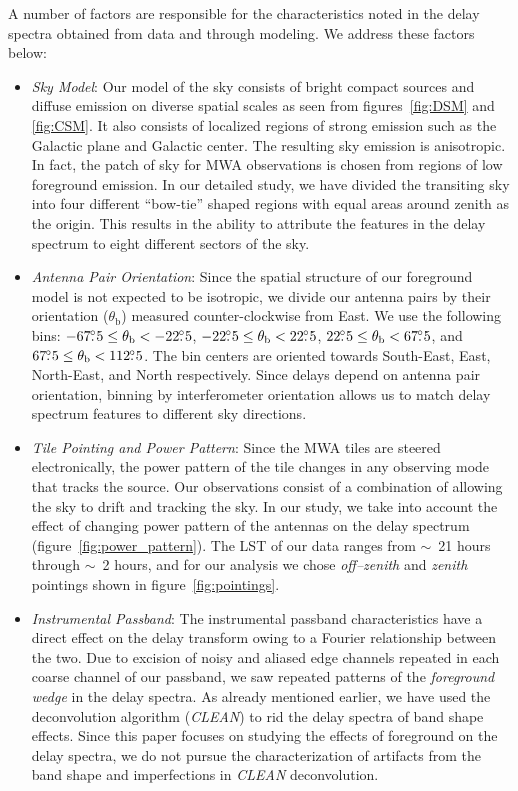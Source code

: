 \documentclass[preprint2,iop,numberedappendix]{emulateapj}
\begin{document}
A number of factors are responsible for the characteristics noted in the delay spectra obtained from data and through modeling. We address these factors below:
\begin{itemize}

\item {\it Sky Model}: Our model of the sky consists of bright compact sources and diffuse emission on diverse spatial scales as seen from figures~\ref{fig:DSM} and \ref{fig:CSM}. It also consists of localized regions of strong emission such as the Galactic plane and Galactic center. The resulting sky emission is anisotropic. In fact, the patch of sky for MWA observations is chosen from regions of low foreground emission. In our detailed study, we have divided the transiting sky into four different ``bow-tie'' shaped regions with equal areas around zenith as the origin. This results in the ability to attribute the features in the delay spectrum to eight different sectors of the sky. 

\item {\it Antenna Pair Orientation}: Since the spatial structure of our foreground model is not expected to be isotropic, we divide our antenna pairs by their orientation ($\theta_\textrm{b}$) measured counter-clockwise from East. We use the following bins: $-67\mbox{$.\!\!^\circ$} 5\le \theta_\textrm{b} < -22\mbox{$.\!\!^\circ$} 5$, $-22\mbox{$.\!\!^\circ$} 5\le \theta_\textrm{b} < 22\mbox{$.\!\!^\circ$} 5$, $22\mbox{$.\!\!^\circ$} 5\le \theta_\textrm{b} < 67\mbox{$.\!\!^\circ$} 5$, and $67\mbox{$.\!\!^\circ$} 5\le \theta_\textrm{b} < 112\mbox{$.\!\!^\circ$} 5$. The bin centers are oriented towards South-East, East, North-East, and North respectively. Since delays depend on antenna pair orientation, binning by interferometer orientation allows us to match delay spectrum features to different sky directions.

\item {\it Tile Pointing and Power Pattern}: Since the MWA tiles are steered electronically, the power pattern of the tile changes in any observing mode that tracks the source. Our observations consist of a combination of allowing the sky to drift and tracking the sky. In our study, we take into account the effect of changing power pattern of the antennas on the delay spectrum (figure~\ref{fig:power_pattern}). The LST of our data ranges from $\sim$~21 hours through $\sim$~2 hours, and for our analysis we chose {\it off--zenith} and {\it zenith} pointings shown in figure~\ref{fig:pointings}. 

\item {\it Instrumental Passband}: The instrumental passband characteristics have a direct effect on the delay transform owing to a Fourier relationship between the two. Due to excision of noisy and aliased edge channels repeated in each coarse channel of our passband, we saw repeated patterns of the {\it foreground wedge} in the delay spectra. As already mentioned earlier, we have used the deconvolution algorithm ({\it CLEAN}) to rid the delay spectra of band shape effects. Since this paper focuses on studying the effects of foreground on the delay spectra, we do not pursue the characterization of artifacts from the band shape and imperfections in {\it CLEAN} deconvolution.

\end{itemize}
\end{document}
